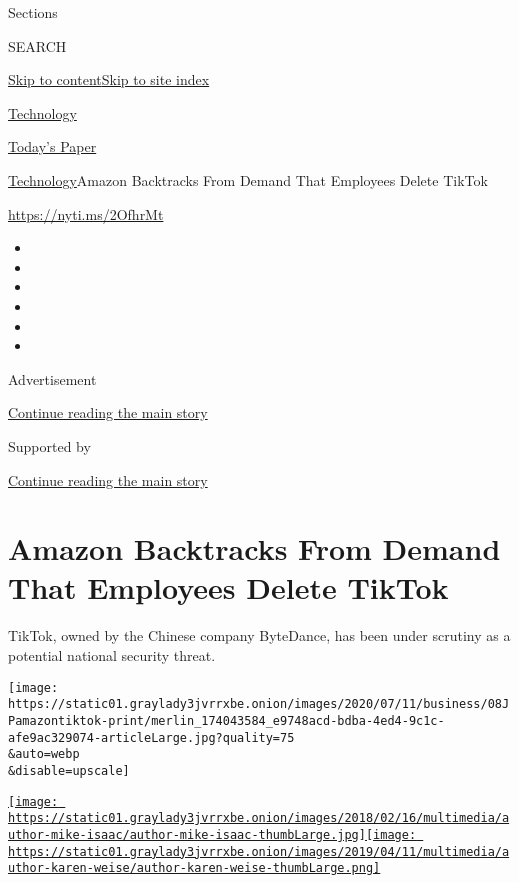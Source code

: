 Sections

SEARCH

\protect\hyperlink{site-content}{Skip to
content}\protect\hyperlink{site-index}{Skip to site index}

\href{https://www.nytimes3xbfgragh.onion/section/technology}{Technology}

\href{https://myaccount.nytimes3xbfgragh.onion/auth/login?response_type=cookie\&client_id=vi}{}

\href{https://www.nytimes3xbfgragh.onion/section/todayspaper}{Today's
Paper}

\href{/section/technology}{Technology}\textbar{}Amazon Backtracks From
Demand That Employees Delete TikTok

\url{https://nyti.ms/2OfhrMt}

\begin{itemize}
\item
\item
\item
\item
\item
\item
\end{itemize}

Advertisement

\protect\hyperlink{after-top}{Continue reading the main story}

Supported by

\protect\hyperlink{after-sponsor}{Continue reading the main story}

\hypertarget{amazon-backtracks-from-demand-that-employees-delete-tiktok}{%
\section{Amazon Backtracks From Demand That Employees Delete
TikTok}\label{amazon-backtracks-from-demand-that-employees-delete-tiktok}}

TikTok, owned by the Chinese company ByteDance, has been under scrutiny
as a potential national security threat.

\texttt{[image: https://static01.graylady3jvrrxbe.onion/images/2020/07/11/business/08JPamazontiktok-print/merlin\_174043584\_e9748acd-bdba-4ed4-9c1c-afe9ac329074-articleLarge.jpg?quality=75\\\&auto=webp\\\&disable=upscale]}

\href{https://www.nytimes3xbfgragh.onion/by/mike-isaac}{\texttt{[image: https://static01.graylady3jvrrxbe.onion/images/2018/02/16/multimedia/author-mike-isaac/author-mike-isaac-thumbLarge.jpg]}}\href{https://www.nytimes3xbfgragh.onion/by/karen-weise}{\texttt{[image: https://static01.graylady3jvrrxbe.onion/images/2019/04/11/multimedia/author-karen-weise/author-karen-weise-thumbLarge.png]}}

